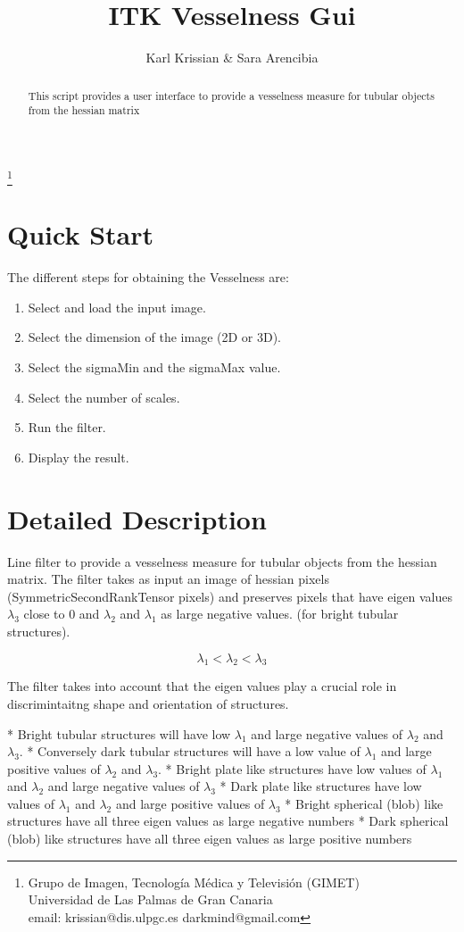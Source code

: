 \documentclass{article}
\begin{document}
\title{ITK Vesselness Gui}
\author{Karl Krissian \& Sara Arencibia}
\thanks{
Grupo de Imagen, Tecnolog\'ia M\'edica y Televisi\'on (GIMET)\\
Universidad de Las Palmas de Gran Canaria\\
email: krissian@dis.ulpgc.es darkmind@gmail.com
}


\maketitle

\begin{abstract}
This script provides a user interface to provide a vesselness measure for tubular objects from the hessian matrix
\end{abstract}


\section{Quick Start}

The different steps for obtaining the Vesselness are:
\begin{enumerate}
  \item Select and load the input image.
  \item Select the dimension of the image (2D or 3D).
  \item Select the sigmaMin and the sigmaMax value.
  \item Select the number of scales.
  \item Run the filter.
  \item Display the result.
\end{enumerate}


\section{Detailed Description}
Line filter to provide a vesselness measure for tubular objects from the hessian matrix. The filter takes as input an image of hessian pixels (SymmetricSecondRankTensor pixels) and preserves pixels that have eigen values $ \lambda_3 $ close to 0 and $\lambda_2$ and $\lambda_1$ as large negative values. (for bright tubular structures).

\[ \lambda_1 < \lambda_2 < \lambda_3 \]

The filter takes into account that the eigen values play a crucial role in discrimintaitng shape and orientation of structures.

    * Bright tubular structures will have low $\lambda_1$ and large negative values of $\lambda_2$ and $\lambda_3$.
    * Conversely dark tubular structures will have a low value of $\lambda_1$ and large positive values of $\lambda_2$ and $\lambda_3$.
    * Bright plate like structures have low values of $\lambda_1$ and $\lambda_2$ and large negative values of $\lambda_3$
    * Dark plate like structures have low values of $\lambda_1$ and $\lambda_2$ and large positive values of $\lambda_3$
    * Bright spherical (blob) like structures have all three eigen values as large negative numbers
    * Dark spherical (blob) like structures have all three eigen values as large positive numbers
\end{document}

